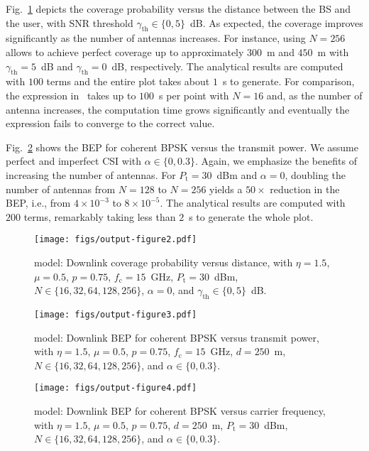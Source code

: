 \documentclass[journal,twocolumn]{IEEEtran}
\begin{document}
Fig.~\ref{fig:hm-coverage1} depicts the coverage probability versus the distance between the \ac{BS} and the user, with \ac{SNR} threshold $\gamma_\textrm{th} \in \{0, 5\}$~dB. As expected, the coverage improves significantly as the number of antennas increases. For instance, using $N=256$ allows to achieve perfect coverage up to approximately $300$~m and $450$~m with $\gamma_\textrm{th} = 5$~dB and $\gamma_\textrm{th} = 0$~dB, respectively. The analytical results are computed with $100$ terms and the entire plot takes about $1$~s to generate. For comparison, the expression in~\cite{Bad21} takes up to $100$~s per point with $N=16$ and, as the number of antenna increases, the computation time grows significantly and eventually the expression fails to converge to the correct value.

Fig.~\ref{fig:eta-bep1} shows the \ac{BEP} for coherent \ac{BPSK} versus the transmit power. We assume perfect and imperfect \ac{CSI} with $\alpha \in \{0,0.3\}$. Again, we emphasize the benefits of increasing the number of antennas. For $P_{\textrm{t}} = 30$~dBm and $\alpha=0$, doubling the number of antennas from $N=128$ to $N=256$ yields a $50 \times$ reduction in the \ac{BEP}, i.e., from $4\times 10^{-3}$ to $8\times 10^{-5}$. The analytical results are computed with $200$ terms, remarkably taking less than $2$~s to generate the whole plot.

\begin{figure}[t]
\centering
\texttt{[image: figs/output-figure2.pdf]}
\caption{\Ehm{} model: Downlink coverage probability versus distance, with $\eta = 1.5$, $\mu = 0.5$, $p=0.75$, $f_\textrm{c} = 15$~GHz, $P_{\textrm{t}} = 30$~dBm, $N \in \{16, 32, 64, 128, 256\}$, $\alpha=0$, and $\gamma_{\text{th}} \in \{0,5\}$~dB.}
\label{fig:hm-coverage1}
\end{figure}

\begin{figure}[t]
    \centering
    \texttt{[image: figs/output-figure3.pdf]}
    \caption{\Ehm{} model: Downlink \ac{BEP} for coherent \ac{BPSK} versus transmit power, with $\eta = 1.5$, $\mu = 0.5$, $p = 0.75$, $f_ \textrm{c} = 15$~GHz, $d = 250$~m, $N \in \{16, 32, 64, 128, 256\}$, and $\alpha \in \{0,0.3\}$.}
    \label{fig:eta-bep1}
\end{figure}

\begin{figure}[t]
    \centering
    \texttt{[image: figs/output-figure4.pdf]}
    \caption{\Ehm{} model: Downlink \ac{BEP} for coherent \ac{BPSK} versus carrier frequency, with $\eta = 1.5$, $\mu = 0.5$, $p = 0.75$, $d = 250$~m, $P_{\textrm{t}} = 30$~dBm, $N \in \{16, 32, 64, 128, 256\}$, and $\alpha\in\{0,0.3\}$.}
    \label{fig:eta-bep2}
\end{figure}
\end{document}
